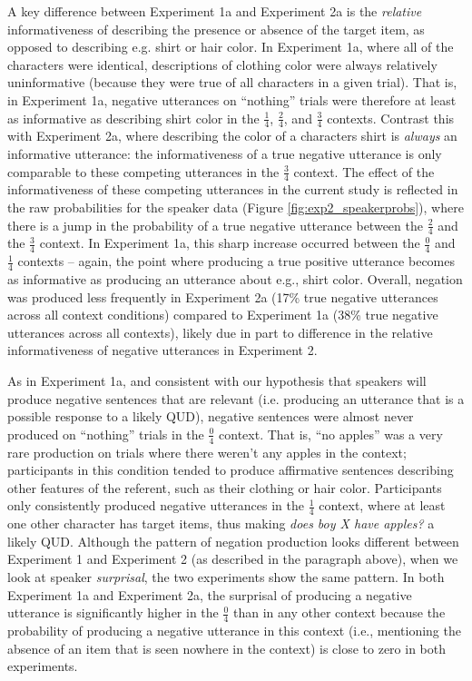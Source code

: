 \documentclass[man, floatsintext, noapacite]{apa6}
\begin{document}
A key difference between Experiment 1a and Experiment 2a is the \textit{relative} informativeness of describing the presence or absence of the target item, as opposed to describing e.g. shirt or hair color. In Experiment 1a, where all of the characters were identical, descriptions of clothing color were always relatively uninformative (because they were true of all characters in a given trial). That is, in Experiment 1a, negative utterances on ``nothing'' trials were therefore at least as informative as describing shirt color in the $\frac{1}{4}$, $\frac{2}{4}$, and $\frac{3}{4}$ contexts. Contrast this with Experiment 2a, where describing the color of a characters shirt is \textit{always} an informative utterance: the informativeness of a true negative utterance is only comparable to these competing utterances in the $\frac{3}{4}$ context. The effect of the informativeness of these competing utterances in the current study is reflected in the raw probabilities for the speaker data (Figure \ref{fig:exp2_speakerprobs}), where there is a jump in the probability of a true negative utterance between the $\frac{2}{4}$ and the $\frac{3}{4}$ context. In Experiment 1a, this sharp increase occurred between the $\frac{0}{4}$ and $\frac{1}{4}$ contexts -- again, the point where producing a true positive utterance becomes as informative as producing an utterance about e.g., shirt color. Overall, negation was produced less frequently in Experiment 2a (17\% true negative utterances across all context conditions) compared to Experiment 1a (38\% true negative utterances across all contexts), likely due in part to difference in the relative informativeness of negative utterances in Experiment 2. 

As in Experiment 1a, and consistent with our hypothesis that speakers will produce negative sentences that are relevant (i.e. producing an utterance that is a possible response to a likely QUD), negative sentences were almost never produced on “nothing” trials in the $\frac{0}{4}$ context. That is, “no apples” was a very rare production on trials where there weren’t any apples in the context; participants in this condition tended to produce affirmative sentences describing other features of the referent, such as their clothing or hair color. Participants only consistently produced negative utterances in the $\frac{1}{4}$ context, where at least one other character has target items, thus making \textit{does boy X have apples?} a likely QUD. Although the pattern of negation production looks different between Experiment 1 and Experiment 2 (as described in the paragraph above), when we look at speaker \textit{surprisal}, the two experiments show the same pattern. In both Experiment 1a and Experiment 2a, the surprisal of producing a negative utterance is significantly higher in the $\frac{0}{4}$ than in any other context because the probability of producing a negative utterance in this context (i.e., mentioning the absence of an item that is seen nowhere in the context) is close to zero in both experiments. 
\end{document}

